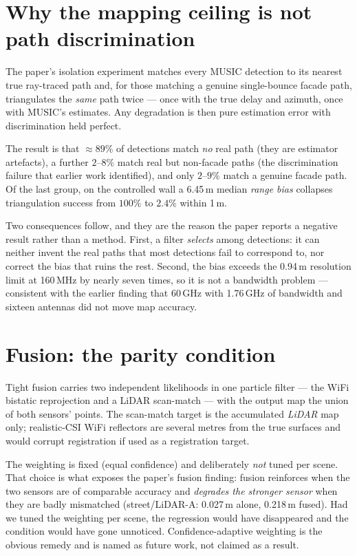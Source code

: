 \documentclass[journal]{IEEEtran}
\newcommand{\SI}[2]{#1\,#2}
\begin{document}
\section{Why the mapping ceiling is not path discrimination}

The paper's isolation experiment matches every MUSIC detection to its nearest true
ray-traced path and, for those matching a genuine single-bounce facade path, triangulates
the \emph{same} path twice --- once with the true delay and azimuth, once with MUSIC's
estimates. Any degradation is then pure estimation error with discrimination held perfect.

The result is that $\approx89\%$ of detections match \emph{no} real path (they are estimator
artefacts), a further $2$--$8\%$ match real but non-facade paths (the discrimination failure
that earlier work identified), and only $2$--$9\%$ match a genuine facade path. Of the last
group, on the controlled wall a \SI{6.45}{m} median \emph{range bias} collapses triangulation
success from $100\%$ to $2.4\%$ within \SI{1}{m}.

Two consequences follow, and they are the reason the paper reports a negative result rather
than a method. First, a filter \emph{selects} among detections: it can neither invent the
real paths that most detections fail to correspond to, nor correct the bias that ruins the
rest. Second, the bias exceeds the \SI{0.94}{m} resolution limit at \SI{160}{MHz} by nearly
seven times, so it is not a bandwidth problem --- consistent with the earlier finding that
\SI{60}{GHz} with \SI{1.76}{GHz} of bandwidth and sixteen antennas did not move map accuracy.

\section{Fusion: the parity condition}

Tight fusion carries two independent likelihoods in one particle filter --- the WiFi bistatic
reprojection and a LiDAR scan-match --- with the output map the union of both sensors' points.
The scan-match target is the accumulated \emph{LiDAR} map only; realistic-CSI WiFi reflectors
are several metres from the true surfaces and would corrupt registration if used as a
registration target.

The weighting is fixed (equal confidence) and deliberately \emph{not} tuned per scene. That
choice is what exposes the paper's fusion finding: fusion reinforces when the two sensors are
of comparable accuracy and \emph{degrades the stronger sensor} when they are badly mismatched
(street/LiDAR-A: \SI{0.027}{m} alone, \SI{0.218}{m} fused). Had we tuned the weighting per
scene, the regression would have disappeared and the condition would have gone unnoticed.
Confidence-adaptive weighting is the obvious remedy and is named as future work, not claimed
as a result.
\end{document}
